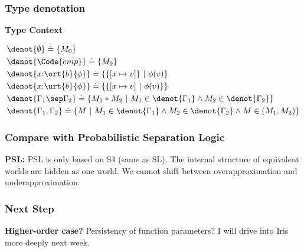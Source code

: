 \begin{frame}[fragile]
    \frametitle{Type denotation}

\textbf{Type Context}

\begin{align*}
    &\denot{\emptyset} \doteq \{M_0\} \\
    &\denot{\Code{emp}} \doteq \{M_0\} \\
    &\denot{x{:}\ort{b}{\phi}} \doteq \{ \{[x\mapsto v]\} ~|~ \phi(v) \} \\
    &\denot{x{:}\urt{b}{\phi}} \doteq \{ \{[x\mapsto v] ~|~ \phi(v) \} \} \\
    &\denot{\Gamma_1 \sep \Gamma_2} \doteq \{ M_1 * M_2 ~|~ M_1 \in \denot{\Gamma_1} \land M_2 \in \denot{\Gamma_2} \} \\
    &\denot{\Gamma_1 , \Gamma_2} \doteq \{ M ~|~ M_1 \in \denot{\Gamma_1} \land M_2 \in \denot{\Gamma_2} \land M \in (M_1 , M_2) \} \\
\end{align*}

\end{frame}

\begin{frame}[fragile]
    \frametitle{Compare with Probabilistic Separation Logic}

\textbf{PSL:} PSL is only based on S4 (same as SL). The internal structure of equivalent worlds are hidden as one world. We cannot shift between overapproximation and underapproximation.

\end{frame}

\begin{frame}[fragile]
    \frametitle{Next Step}

\textbf{Higher-order case?} Persistency of function parameters? I will drive into Iris more deeply next week.

\end{frame}